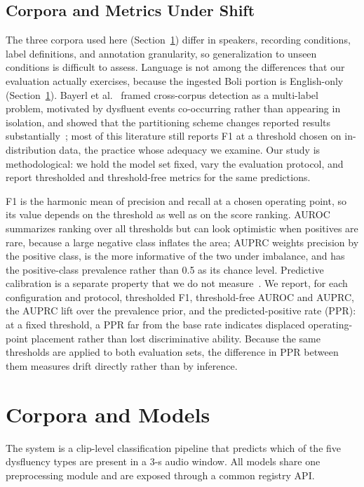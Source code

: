 \documentclass[a4paper,orivec]{llncs}
\begin{document}
\subsection{Corpora and Metrics Under Shift}
The three corpora used here (Section~\ref{sec:arch}) differ in speakers,
recording conditions, label definitions, and annotation granularity,
so generalization to unseen conditions is difficult to assess. Language is not
among the differences that our evaluation actually exercises, because the
ingested Boli portion is English-only (Section~\ref{sec:arch}). Bayerl et
al.~\cite{bayerl2023crosscorpus} framed cross-corpus detection as a
multi-label problem, motivated by dysfluent events co-occurring rather than
appearing in isolation, and showed that the partitioning scheme changes reported
results substantially~\cite{bayerl2022partitioning}; most of this literature
still reports F1 at a threshold chosen on in-distribution data, the practice
whose adequacy we examine. Our study is methodological: we
hold the model set fixed, vary the evaluation protocol, and report thresholded
and threshold-free metrics for the same predictions.

F1 is the harmonic mean of precision and recall at a chosen operating point, so
its value depends on the threshold as well as on the score ranking. AUROC
summarizes ranking over all thresholds but can look optimistic when positives
are rare, because a large negative class inflates the area; AUPRC weights
precision by the positive class, is the more informative of the two under
imbalance, and has the positive-class prevalence rather than 0.5 as its chance
level. Predictive calibration is a separate property that we do not
measure~\cite{guo2017calibration}. We report, for each configuration and
protocol, thresholded F1, threshold-free AUROC and AUPRC, the AUPRC lift over the
prevalence prior, and the predicted-positive rate (PPR): at a fixed threshold, a
PPR far from the base rate indicates displaced operating-point placement rather
than lost discriminative ability. Because the same thresholds are applied to both
evaluation sets, the difference in PPR between them measures drift directly
rather than by inference.

\section{Corpora and Models}
\label{sec:arch}

The system is a clip-level classification pipeline that predicts which of the
five dysfluency types are present in a 3-s audio window. All models share one
preprocessing module and are exposed through a common registry API.
\end{document}
